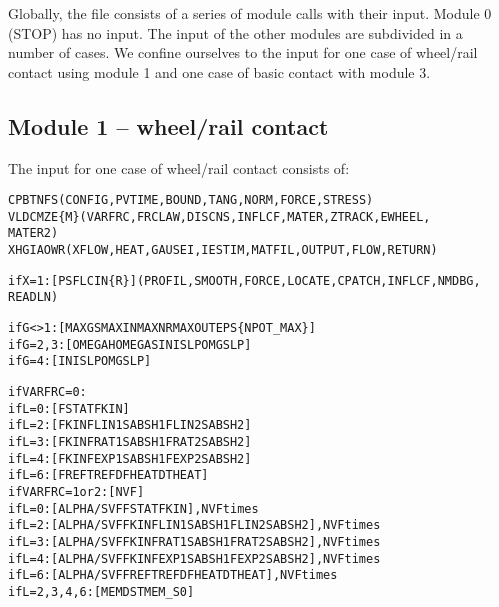 \documentclass[12pt]{report}
\renewcommand{\magenta}[1]{}
\begin{document}
Globally, the file consists of a series of module calls with their input.
Module 0 (STOP) has no input. The input of the other modules are subdivided
in a number of cases. We confine ourselves to the input for one case of
wheel/rail contact using module 1 and one case of basic contact with module 3.

\subsection{Module 1 -- wheel/rail contact}

The input for one case of wheel/rail contact consists of:
\begin{alltt}\small
% Control integers, see section \ref{sec:controldigits}:

 CPBTNFS       (        CONFIG, PVTIME, BOUND , TANG  , NORM  , FORCE , STRESS)
 VLDCMZE  \{M\}  (        VARFRC, FRCLAW, DISCNS, INFLCF, MATER , ZTRACK, EWHEEL,
                                                                        MATER2)
XHGIAOWR       (XFLOW , HEAT  , GAUSEI, IESTIM, MATFIL, OUTPUT, FLOW  , RETURN)

% Parameters for additional debug output

if X=1: [ PSFLCIN \{R\} ] (PROFIL, SMOOTH, FORCE, LOCATE, CPATCH, INFLCF, NMDBG,
                                                                        READLN)

% Parameters for the iterative solution algorithms (section \ref{sec:iter_const}):

if G<>1:      [ MAXGS   MAXIN   MAXNR   MAXOUT  EPS   \{NPOT\_MAX\}   ]
if G=2,3:     [ OMEGAH  OMEGAS  INISLP  OMGSLP        ]
if G=4:       [ INISLP  OMGSLP                        ]
\magenta{if G=5:       [ FDECAY  BETATH  KDOWFB  D\_IFC   D\_LIN   D\_CNS   D\_SLP   POW\_S ]
}
% Friction description (section \ref{sec:fric_dscrp}):
%      L=0 --> Coulomb friction with constant coefficient of friction
%      L=2 --> velocity dependent friction with linear/const formula
%      L=3 --> velocity dependent friction with rational formula
%      L=4 --> velocity dependent friction with exponential formula
%      L=6 --> temperature dependent friction with piecewise linear formula

if VARFRC=0:
      if L=0: [ FSTAT  FKIN                                ]
      if L=2: [ FKIN   FLIN1  SABSH1  FLIN2  SABSH2        ]
      if L=3: [ FKIN   FRAT1  SABSH1  FRAT2  SABSH2        ]
      if L=4: [ FKIN   FEXP1  SABSH1  FEXP2  SABSH2        ]
      if L=6: [ FREF   TREF   DFHEAT  DTHEAT               ]
if VARFRC=1 or 2:  [ NVF                                        ]
      if L=0: [ ALPHA/SVF   FSTAT  FKIN                         ], NVF times
      if L=2: [ ALPHA/SVF   FKIN   FLIN1  SABSH1  FLIN2  SABSH2 ], NVF times
      if L=3: [ ALPHA/SVF   FKIN   FRAT1  SABSH1  FRAT2  SABSH2 ], NVF times
      if L=4: [ ALPHA/SVF   FKIN   FEXP1  SABSH1  FEXP2  SABSH2 ], NVF times
      if L=6: [ ALPHA/SVF   FREF   TREF   DFHEAT  DTHEAT        ], NVF times
if L=2,3,4,6: [ MEMDST MEM\_S0                                   ]


\end{alltt}
\end{document}
